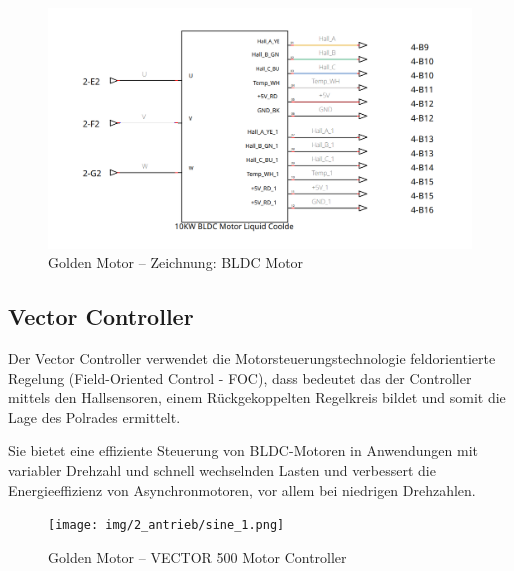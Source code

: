 \begin{figure}[ht]
	\begin{center}
		\includegraphics[width=1\textwidth]{img/2_imp/2_circ_bldc_motor.png}
		\caption{Golden Motor – Zeichnung: BLDC Motor}
		\label{img_2_2:circ_bldc:1}
	\end{center}
\end{figure}


\subsection{Vector Controller}
Der Vector Controller verwendet die Motorsteuerungstechnologie feldorientierte Regelung (Field-Oriented Control - FOC), dass bedeutet das der Controller mittels den Hallsensoren, einem Rückgekoppelten Regelkreis bildet und somit die Lage des Polrades ermittelt.

\cite{schroeder:elektische_antriebe}

Sie bietet eine effiziente Steuerung von BLDC-Motoren in Anwendungen mit variabler Drehzahl und schnell wechselnden Lasten und verbessert die Energieeffizienz von Asynchronmotoren, vor allem bei niedrigen Drehzahlen.


\begin{figure}[!ht]
	\begin{center}
		\texttt{[image: img/2\_antrieb/sine\_1.png]}
		\caption{Golden Motor – VECTOR 500 Motor Controller}
		\label{img_2_2:antrieb_sine:1}
	\end{center}
\end{figure}


